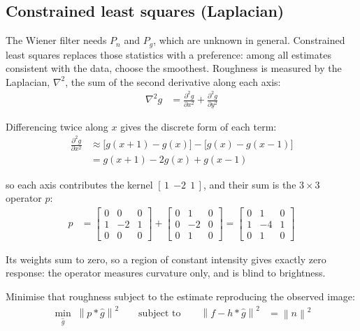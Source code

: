 \documentclass[10pt,twocolumn,letterpaper]{article}
\begin{document}

\newpage
\subsection*{Constrained least squares (Laplacian)}

The Wiener filter needs $P_{n}$ and $P_{g}$, which are unknown in general. Constrained least
squares replaces those statistics with a preference: among all estimates consistent with the
data, choose the smoothest. Roughness is measured by the Laplacian, $\nabla^{2}$, the sum of
the second derivative along each axis:
\begin{align}
  \nabla^{2} g &= \frac{\partial^{2} g}{\partial x^{2}}
                + \frac{\partial^{2} g}{\partial y^{2}}
\end{align}

\noindent Differencing twice along $x$ gives the discrete form of each term:
\begin{align}
  \frac{\partial^{2} g}{\partial x^{2}}
    &\approx \bigl[g(x{+}1) - g(x)\bigr] - \bigl[g(x) - g(x{-}1)\bigr] \nonumber \\
    &= g(x{+}1) - 2g(x) + g(x{-}1)
\end{align}

\noindent so each axis contributes the kernel $[\,1\ \ {-2}\ \ 1\,]$, and their sum is the
$3 \times 3$ operator $p$:
\begin{align}
  p &=
  \begin{bmatrix}
    0 & 0 & 0 \\
    1 & -2 & 1 \\
    0 & 0 & 0
  \end{bmatrix}
  +
  \begin{bmatrix}
    0 & 1 & 0 \\
    0 & -2 & 0 \\
    0 & 1 & 0
  \end{bmatrix}
  =
  \begin{bmatrix}
    0 &  1 & 0 \\
    1 & -4 & 1 \\
    0 &  1 & 0
  \end{bmatrix}
\end{align}

\noindent Its weights sum to zero, so a region of constant intensity gives exactly zero
response: the operator measures curvature only, and is blind to brightness.

\noindent Minimise that roughness subject to the estimate reproducing the observed image:
\begin{align}
  \min_{\hat{g}} \; \left\lVert p * \hat{g} \right\rVert^{2}
  \qquad \text{subject to} \qquad
  \left\lVert f - h * \hat{g} \right\rVert^{2} &= \left\lVert n \right\rVert^{2}
\end{align}
\end{document}
